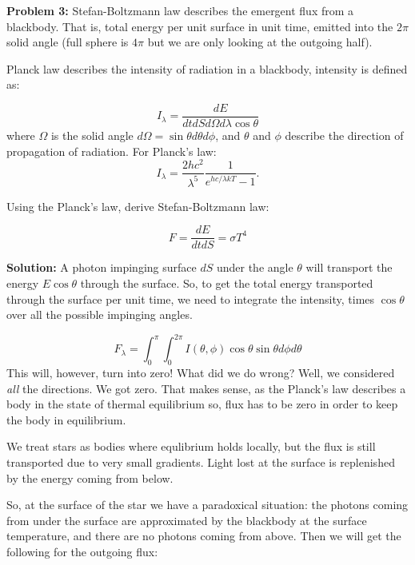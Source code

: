 \documentclass[12pt]{article}
\begin{document}
\pagebreak

{\bf Problem 3:} Stefan-Boltzmann law describes the emergent flux from a blackbody. That is, total energy per unit surface in unit time, emitted into the $2\pi$ solid angle (full sphere is $4\pi$ but we are only looking at the outgoing half).

Planck law describes the intensity of radiation in a blackbody, intensity is defined as: 

\begin{equation}
I_\lambda = \frac{dE}{dt dS d\Omega d\lambda \cos \theta}
\end{equation}
where $\Omega$ is the solid angle $d\Omega = \sin \theta d\theta d\phi$, and $\theta$ and $\phi$ describe the direction of propagation of radiation. For Planck's law:
\begin{equation}
I_\lambda = \frac{2hc^2}{\lambda^5} \frac{1}{e^{hc/\lambda k T} - 1}.
\end{equation}

Using the Planck's law, derive Stefan-Boltzmann law:

\begin{equation}
F = \frac{dE}{dt dS} = \sigma T^4
\end{equation}

{\bf Solution:} A photon impinging surface $dS$ under the angle $\theta$ will transport the energy $E \cos \theta$ through the surface. So, to get the total energy transported through the surface per unit time, we need to integrate the intensity, times $\cos \theta$ over all the possible impinging angles. 

\begin{equation}
F_\lambda = \int_0^{\pi} \int_0^{2\pi} I(\theta, \phi) \cos \theta \sin \theta d \phi d \theta
\end{equation}
This will, however, turn into zero! What did we do wrong? Well, we considered \emph{all} the directions. We got zero. That makes sense, as the Planck's law describes a body in the state of thermal equilibrium so, flux has to be zero in order to keep the body in equilibrium. 

We treat stars as bodies where equlibrium holds locally, but the flux is still transported due to very small gradients. Light lost at the surface is replenished by the energy coming from below. 

So, at the surface of the star we have a paradoxical situation: the photons coming from under the surface are approximated by the blackbody at the surface temperature, and there are no photons coming from above. Then we will get the following for the outgoing flux: 
\end{document}
